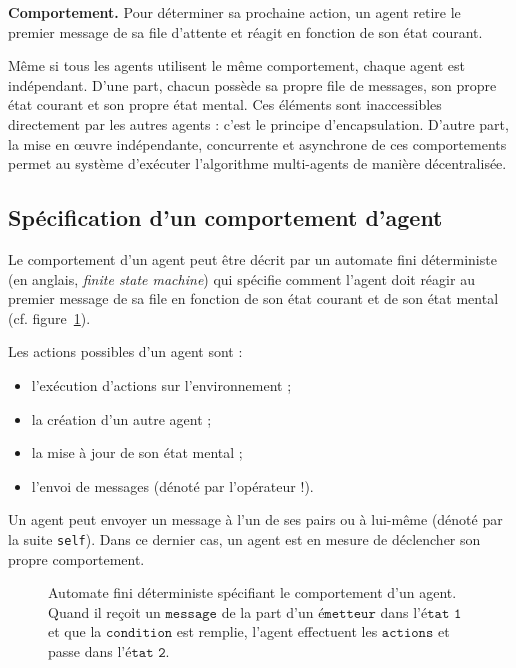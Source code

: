 \documentclass[a4paper, 11pt]{article}
\begin{document}
\textbf{Comportement.} Pour déterminer sa prochaine action, un agent
retire le premier message de sa file d'attente et réagit en fonction
de son état courant.

Même si tous les agents utilisent le même comportement, chaque agent
est indépendant. D'une part, chacun possède sa propre file de
messages, son propre état courant et son propre état mental. Ces
éléments sont inaccessibles directement par les autres agents : c'est
le principe d'encapsulation. D'autre part, la mise en œuvre
indépendante, concurrente et asynchrone de ces comportements permet au
système d'exécuter l'algorithme multi-agents de manière décentralisée.

\subsection*{Spécification d'un comportement d'agent}

Le comportement d'un agent
peut être décrit par un automate fini déterministe (en anglais,
\textit{finite state machine}) qui spécifie comment l'agent doit
réagir au premier message de sa file en fonction de son état courant
et de son état mental (cf. figure~\ref{fig:comportement}).

Les actions possibles d'un agent sont :
\begin{itemize}
\item l'exécution d'actions sur l'environnement ;
\item la création d'un autre agent ;
\item la mise à jour de son état mental ;
\item l'envoi de messages (dénoté par l'opérateur $\texttt{!}$).
\end{itemize}
Un agent peut envoyer un message à l'un de ses pairs ou à lui-même
(dénoté par la suite \texttt{self}). Dans ce dernier cas, un agent est
en mesure de déclencher son propre comportement.

\begin{figure}[h!]
  \centering
    \centering
  \caption{Automate fini déterministe spécifiant le comportement d'un
    agent.  Quand il reçoit un $\texttt{message}$ de la part d'un
    $\texttt{émetteur}$ dans l'$\texttt{état 1}$ et que la
    $\texttt{condition}$ est remplie, l'agent effectuent les
    $\texttt{actions}$ et passe dans l'$\texttt{état 2}$.}
  \label{fig:comportement}
\end{figure}
\end{document}
